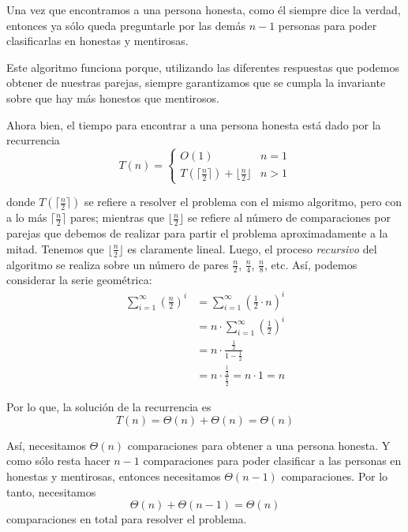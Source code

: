 \documentclass[letterpaper,11pt]{article}
\begin{document}
\begin{enumerate}
    Una vez que encontramos a una persona honesta, como él siempre dice la 
    verdad, entonces ya sólo queda preguntarle por las demás $n-1$ personas 
    para poder clasificarlas en honestas y mentirosas. 

    Este algoritmo funciona porque, utilizando las diferentes respuestas que 
    podemos obtener de nuestras parejas, siempre garantizamos que se cumpla 
    la invariante sobre que hay más honestos que mentirosos. 

    Ahora bien, el tiempo para encontrar a una persona honesta está dado por 
    la recurrencia
    \begin{equation*}
        T(n) =
        \left\{
            \begin{array}{ll}
                O(1)  & n = 1 \\
                T(\lceil \frac{n}{2} \rceil) + \lfloor \frac{n}{2} \rfloor & 
                n > 1
            \end{array}
        \right.
    \end{equation*}

    donde $T(\lceil \frac{n}{2} \rceil)$ se refiere a resolver el problema con 
    el mismo algoritmo, pero con a lo más $\lceil \frac{n}{2} \rceil$ pares; 
    mientras que $\lfloor \frac{n}{2} \rfloor$ se refiere al número de 
    comparaciones por parejas que debemos de realizar para partir el problema 
    aproximadamente a la mitad. Tenemos que $\lfloor \frac{n}{2} \rfloor$ es 
    claramente lineal. Luego, el proceso \textit{recursivo} del algoritmo 
    se realiza sobre un número de pares $\frac{n}{2}$, $\frac{n}{4}$, 
    $\frac{n}{8}$, etc. Así, podemos considerar la serie geométrica:
    \begin{align*}
        \sum_{i=1}^{\infty} \left(\frac{n}{2} \right)^i 
        &= \sum_{i=1}^{\infty} \left(\frac{1}{2} \cdot n \right)^i \\
        &= n \cdot \sum_{i=1}^{\infty} \left(\frac{1}{2}\right)^i \\
        &= n \cdot \frac{\frac{1}{2}}{1 - \frac{1}{2}} \\
        &= n \cdot \frac{\frac{1}{2}}{\frac{1}{2}} = n \cdot 1 = n 
    \end{align*}

    Por lo que, la solución de la recurrencia es 
    \begin{equation*}
        T(n) = \Theta(n) + \Theta(n) = \Theta(n) 
    \end{equation*}

    Así, necesitamos $\Theta(n)$ comparaciones para obtener a una persona 
    honesta. Y como sólo resta hacer $n-1$ comparaciones para poder clasificar 
    a las personas en honestas y mentirosas, entonces necesitamos $\Theta(n-1)$
    comparaciones. Por lo tanto, necesitamos 
    \begin{equation*}
        \Theta(n) + \Theta(n-1) = \Theta(n)
    \end{equation*} 
    comparaciones en total para resolver el problema. 


\end{enumerate}
\end{document}
